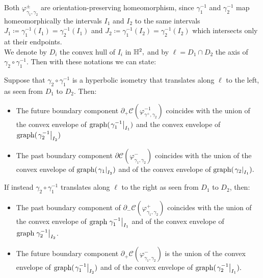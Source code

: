 Both $\varphi_{\gamma_1,\gamma_2}^{\pm}$ are orientation-preserving homeomorphism, since $\gamma_1^{-1}$ and $\gamma_2^{-1}$ map homeomorphically the intervals $I_1$ and $I_2$ to the same intervals $J_1\coloneqq\gamma_1^{-1}(I_1)=\gamma_2^{-1}(I_1)$ and $J_2\coloneqq\gamma_1^{-1}(I_2)=\gamma_2^{-1}(I_2)$ which intersects only at their endpoints. \\
We denote by $D_i$ the convex hull of $I_i$ in $\mathbb{H}^2,$ and by $\ell=D_1\cap D_2$ the axis of $\gamma_2\circ\gamma_1^{-1}$. Then with these notations we can state: 

\begin{proposition}\label{gettinthere}
    Suppose that $\gamma_2\circ\gamma_1^{-1}$ is a hyperbolic isometry that translates along $\ell$ to the left, as seen from $D_1$ to $D_2$. Then:
    \begin{itemize}
        \item The future boundary component $\partial_+\mathcal{C}(\varphi_{\gamma^+,\gamma_2}^{-1})$ coincides with the union of the convex envelope of $\text{graph}(\left.\gamma_1^{-1}\right|_{I_1})$ and the convex envelope of $\text{graph}(\left.\gamma_2^{-1}\right|_{I_2})$
        \item The past boundary component $\partial\mathcal{C}(\varphi^-_{\gamma_1,\gamma_2})$ coincides with the union of the convex envelope of $\text{graph}(\left.\gamma_1\right|_{I_2})$ and of the convex envelope of $\text{graph}(\left.\gamma_2\right|_{I_1}).$
    \end{itemize}
    If instead $\gamma_2\circ\gamma_1^{-1}$ translates along $\ell$ to the right as seen from $D_1$ to $D_2$, then:
    \begin{itemize}
        \item The past boundary component of $\partial_-\mathcal{C}(\varphi_{\gamma_1,\gamma_2}^+)$ coincides with the union of the convex envelope of $\text{graph}\left.\gamma_1^{-1}\right|_{I_1}$ and of the convex envelope of $\text{graph}\left.\gamma_2^{-1}\right|_{I_2}$. 
        \item The future boundary component $\partial_+\mathcal{C}(\varphi_{\gamma_1,\gamma_2}^-)$ is the union of the convex envelope of $\text{graph}(\left.\gamma_1^{-1}\right|_{I_2})$ and of the convex envelope of $\text{graph}(\left.\gamma_2^{-1}\right|_{I_1}).$
    \end{itemize}
\end{proposition}

